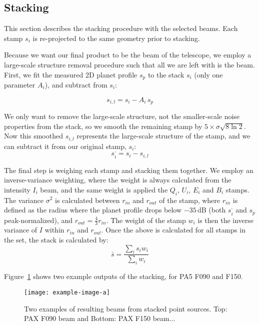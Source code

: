 \subsection{Stacking}

This section describes the stacking procedure with the selected beams.  Each stamp $s_i$ is re-projected to the same geometry prior to stacking.

Because we want our final product to be the beam of the telescope, we employ a large-scale structure removal procedure such that all we are left with is the beam.  First, we fit the measured 2D planet profile $s_p$ to the stack $s_i$ (only one parameter $A_i$), and subtract from $s_i$:

\begin{equation}
    s_{i,l} = s_i- A_i\,s_p
\end{equation}

We only want to remove the large-scale structure, not the smaller-scale noise properties from the stack, so we smooth the remaining stamp by $5\times\sigma\sqrt{8\ln2}$.  Now this smoothed $s_{i,l}$ represents the large-scale structure of the stamp, and we can subtract it from our original stamp, $s_i$:
\begin{equation}
    s_i^{,} = s_i - s_{i,l}
\end{equation}

The final step is weighing each stamp and stacking them together.  We employ an inverse-variance weighting, where the weight is always calculated from the intensity $I_i$ beam, and the same weight is applied the $Q_i$, $U_i$, $E_i$ and $B_i$ stamps.  The variance $\sigma^2$ is calculated between $r_{in}$ and $r_{out}$ of the stamp, where $r_{in}$ is defined as the radius where the planet profile drops below $-35$\,dB (both $s_i^{,}$ and $s_p$ peak-normalized), and $r_{out}=\frac{4}{3}r_{in}$.  The weight of the stamp $w_i$ is then the inverse variance of $I$ within $r_{in}$ and $r_{out}$.  Once the above is calculated for all stamps in the set, the stack is calculated by:
\begin{equation}
    \bar{s} = \frac{\sum_i s_i w_i }{\sum_i w_i}
\end{equation}

Figure~\ref{fig:example_maps} shows two example outputs of the stacking, for PA5 F090 and F150.  

\begin{figure}
    \centering
    \texttt{[image: example-image-a]}
    \caption{Two examples of resulting beams from stacked point sources.  Top: PAX F090 beam and Bottom: PAX F150 beam...}
    \label{fig:example_maps}
    \vspace{1em}
\end{figure}

